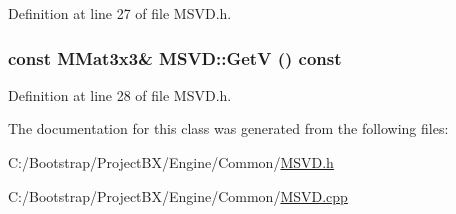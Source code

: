 Definition at line 27 of file MSVD.h.\hypertarget{class_m_s_v_d_3b8af7f2557b0b17332ed157e280127a}{
\subsubsection[{GetV}]{\setlength{\rightskip}{0pt plus 5cm}const {\bf MMat3x3}\& MSVD::GetV () const}}
\label{class_m_s_v_d_3b8af7f2557b0b17332ed157e280127a}




Definition at line 28 of file MSVD.h.

The documentation for this class was generated from the following files:\begin{CompactItemize}
\item 
C:/Bootstrap/ProjectBX/Engine/Common/\hyperlink{_m_s_v_d_8h}{MSVD.h}\item 
C:/Bootstrap/ProjectBX/Engine/Common/\hyperlink{_m_s_v_d_8cpp}{MSVD.cpp}\end{CompactItemize}
